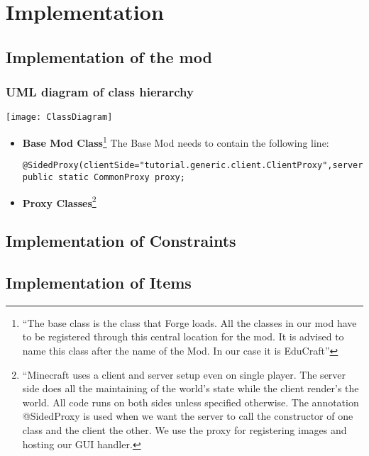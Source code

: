 \chapter{Implementation}
\label{ch:implementation}

\section{Implementation of the mod}
\subsection{UML diagram of class hierarchy}
\texttt{[image: ClassDiagram]}
\begin{itemize}
\item \textbf{Base Mod Class}\footnote{``The base class is the class that Forge loads. All the classes in our mod have to be registered through this central location for the mod. It is advised to name this class after the name of the Mod. In our case it is EduCraft''\cite{website:forge-basemods}}\newline
The Base Mod needs to contain the following line:
\begin{lstlisting}
@SidedProxy(clientSide="tutorial.generic.client.ClientProxy",serverSide="tutorial.generic.CommonProxy")
public static CommonProxy proxy;
\end{lstlisting}

\item \textbf{Proxy Classes}\footnote{``Minecraft uses a client and server setup even on single player. The server side does all the maintaining of the world’s state while the client render’s the world. All code runs on both sides unless specified otherwise.\newline
The annotation @SidedProxy is used when we want the server to call the constructor of one class and the client the other. We use the proxy for registering images and hosting our GUI handler.\cite{website:forge-proxy}}
\end{itemize}

\section{Implementation of Constraints}

\section{Implementation of Items}


